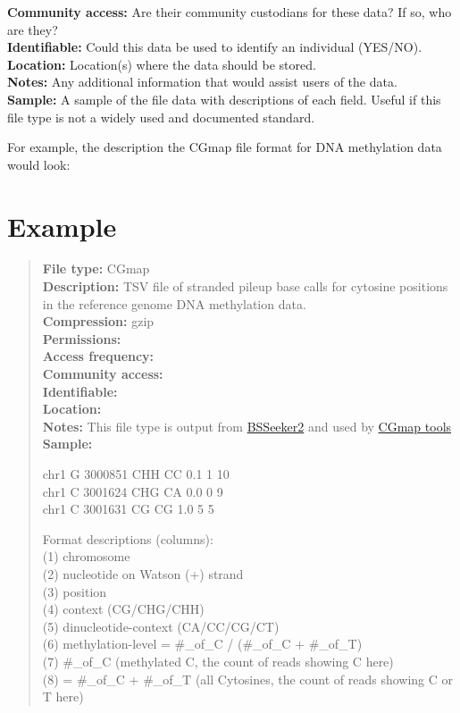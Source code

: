 \documentclass[
  11pt,
]{book}
\begin{document}
\textbf{Community access:} Are their community custodians for these data? If so, who are they?\\

\textbf{Identifiable:} Could this data be used to identify an individual (YES/NO).\\

\textbf{Location:} Location(s) where the data should be stored.\\

\textbf{Notes:} Any additional information that would assist users of the data.\\

\textbf{Sample:} A sample of the file data with descriptions of each field. Useful if this file type is not a widely used and documented standard.

For example, the description the CGmap file format for DNA methylation data would look:

\hypertarget{example}{%
\section{Example}\label{example}}

\begin{quote}
\textbf{File type:} CGmap\\
\textbf{Description:} TSV file of stranded pileup base calls for cytosine positions in the reference genome DNA methylation data.\\
\textbf{Compression:} gzip\\
\textbf{Permissions:}\\
\textbf{Access frequency:}\\
\textbf{Community access:}\\
\textbf{Identifiable:}\\
\textbf{Location:}\\
\textbf{Notes:} This file type is output from \href{https://github.com/BSSeeker/BSseeker2}{BSSeeker2} and used by \href{https://cgmaptools.github.io/}{CGmap tools}\\
\textbf{Sample:}

chr1 G 3000851 CHH CC 0.1 1 10\\
chr1 C 3001624 CHG CA 0.0 0 9\\
chr1 C 3001631 CG CG 1.0 5 5

Format descriptions (columns):\\
(1) chromosome\\
(2) nucleotide on Watson (+) strand\\
(3) position\\
(4) context (CG/CHG/CHH)\\
(5) dinucleotide-context (CA/CC/CG/CT)\\
(6) methylation-level = \#\_of\_C / (\#\_of\_C + \#\_of\_T)\\
(7) \#\_of\_C (methylated C, the count of reads showing C here)\\
(8) = \#\_of\_C + \#\_of\_T (all Cytosines, the count of reads showing C or T here)
\end{quote}
\end{document}
